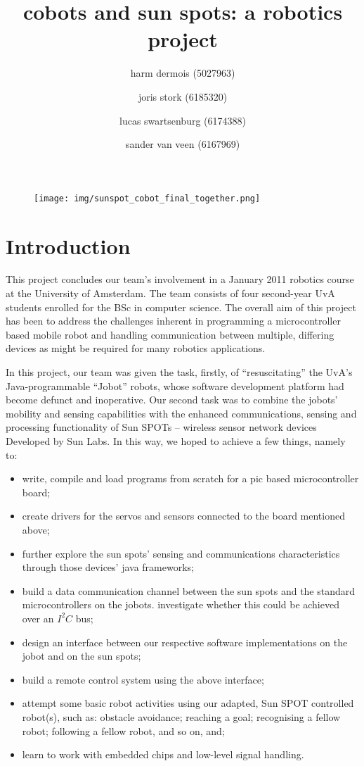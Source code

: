 \documentclass[a4paper,10pt]{article} %
\author{harm dermois (5027963) \and joris stork (6185320) \and
lucas swartsenburg (6174388) \and sander van veen (6167969)}
\title{cobots and sun spots: a robotics project}
\begin{document}
\maketitle

\abstract{}

\begin{figure}[H]
    \label{fig:cobot_sunspot_final}
    \centering
    \texttt{[image: img/sunspot\_cobot\_final\_together.png]}
\end{figure}

\pagebreak

\tableofcontents

\pagebreak

\section{Introduction} %

This project concludes our team's involvement in a January 2011 robotics course
at the University of Amsterdam. The team consists of four second-year UvA
students enrolled for the BSc in computer science. The overall aim of this
project has been to address the challenges inherent in programming a
microcontroller based mobile robot and handling communication between multiple,
differing devices as might be required for many robotics applications.

In this project, our team was given the task, firstly, of ``resuscitating'' the
UvA's Java-programmable ``Jobot'' robots, whose software development platform
had become defunct and inoperative. Our second task was to combine the jobots'
mobility and sensing capabilities with the enhanced communications, sensing and
processing functionality of Sun SPOTs -- wireless sensor network devices
Developed by Sun Labs. In this way, we hoped to achieve a few things, namely to:

\begin{itemize}
    \item write, compile and load programs from scratch for a pic based
    microcontroller board;
    \item create drivers for the servos and sensors connected to the board
    mentioned above;
    \item further explore the sun spots' sensing and communications
    characteristics through those devices' java frameworks;
    \item build a data communication channel between the sun spots and the
    standard microcontrollers on the jobots. investigate whether this could be
    achieved over an $I^2C$ bus;
    \item design an interface between our respective software implementations on
    the jobot and on the sun spots;
    \item build a remote control system using the above interface;
    \item attempt some basic robot activities using our adapted, Sun SPOT
    controlled robot(s), such as: obstacle avoidance; reaching a goal;
    recognising a fellow robot; following a fellow robot, and so on, and;
    \item learn to work with embedded chips and low-level signal handling.
\end{itemize}
\end{document}
